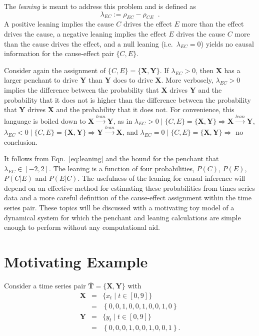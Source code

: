 \documentclass[a4paper,11pt,twocolumn]{article}
\begin{document}
The {\em leaning} is meant to address this problem and is defined as
\begin{equation}
\label{eq:leaning}
\lambda_{EC} := \rho_{EC} - \rho_{CE}\;\;.
\end{equation}
A positive leaning implies the cause $C$ drives the effect $E$ more than the effect drives the cause, a negative leaning implies the effect $E$ drives the cause $C$ more than the cause drives the effect, and a null leaning (i.e.\ $\lambda_{EC} = 0$) yields no causal information for the cause-effect pair $\{C,E\}$.  

Consider again the assignment of $\{C,E\}=\{\mathbf{X},\mathbf{Y}\}$.  If $\lambda_{EC}>0$, then $\mathbf{X}$ has a larger penchant to drive $\mathbf{Y}$ than $\mathbf{Y}$ does to drive $\mathbf{X}$.  More verbosely, $\lambda_{EC}>0$ implies the difference between the probability that $\mathbf{X}$ drives $\mathbf{Y}$ and the probability that it does not is higher than the difference between the probability that $\mathbf{Y}$ drives $\mathbf{X}$ and the probability that it does not.  For convenience, this language is boiled down to $\mathbf{X}\xrightarrow{lean}\mathbf{Y}$, as in
$\lambda_{EC}>0\;|\; \{C,E\}=\{\mathbf{X},\mathbf{Y}\}\Rightarrow\mathbf{X}\xrightarrow{lean}\mathbf{Y}$, $\lambda_{EC}<0\;|\; \{C,E\}=\{\mathbf{X},\mathbf{Y}\}\Rightarrow\mathbf{Y}\xrightarrow{lean}\mathbf{X}$, and $\lambda_{EC}=0\;|\; \{C,E\}=\{\mathbf{X},\mathbf{Y}\}\Rightarrow$ no conclusion.

It follows from Eqn.\ \ref{eq:leaning} and the bound for the penchant that $\lambda_{EC}\in\left[-2,2\right]$.  The leaning is a function of four probabilities, $P(C)$, $P(E)$, $P(C|E)$ and $P(E|C)$.  The usefulness of the leaning for causal inference will depend on an effective method for estimating these probabilities from times series data and a more careful definition of the cause-effect assignment within the time series pair.  These topics will be discussed with a motivating toy model of a dynamical system for which the penchant and leaning calculations are simple enough to perform without any computational aid.

\section{Motivating Example}
Consider a time series pair $\bar{\mathbf{T}}=\{\mathbf{X},\mathbf{Y}\}$ with
\begin{eqnarray*}
\mathbf{X} &=& \{x_t\; | \; t\in[0,9]\}\\
&=& \left\{0,0,1,0,0,1,0,0,1,0\right\}\\
\mathbf{Y} &=& \{y_t\; | \; t\in[0,9]\}\\
&=& \left\{0,0,0,1,0,0,1,0,0,1\right\}.
\end{eqnarray*}
\end{document}
